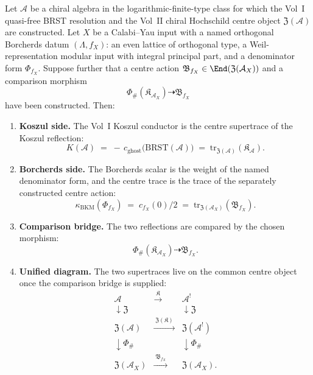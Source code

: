\begin{theorem}
\label{thm:phi-universal-trace}
Let $\mathcal A$ be a chiral algebra in the logarithmic-finite-type
class for which the Vol~I quasi-free BRST resolution and the Vol~II
chiral Hochschild centre object \(\mathfrak Z(\mathcal A)\) are
constructed.  Let \(X\) be a Calabi--Yau input with a named orthogonal
Borcherds datum \((\Lambda,f_X)\): an even lattice of orthogonal type,
a Weil-representation modular input with integral principal part, and a
denominator form \(\Phi_{f_X}\).  Suppose further that a centre action
\(\mathfrak B_{f_X}\in\End(\mathfrak Z(\mathcal A_X))\) and a comparison
morphism
\[
 \Phi_\#(\mathfrak K_{\mathcal A_X})\dashrightarrow \mathfrak B_{f_X}
\]
have been constructed.  Then:
\begin{enumerate}[label=\textup{(\roman*)}]
 \item \textbf{Koszul side.} The Vol~I Koszul conductor is the centre
 supertrace of the Koszul reflection:
 \[
 K(\mathcal{A}) \;=\; -\,c_{\mathrm{ghost}}\bigl(\mathrm{BRST}(\mathcal{A})\bigr)
 \;=\; \mathrm{tr}_{\mathfrak{Z}(\mathcal{A})}(\mathfrak{K}_{\mathcal{A}}).
 \]
 \item \textbf{Borcherds side.} The Borcherds scalar is the weight of
 the named denominator form, and the centre trace is the trace of the
 separately constructed centre action:
 \[
 \kappa_{\mathrm{BKM}}(\Phi_{f_X})
 \;=\; c_{f_X}(0)/2
 \;=\; \mathrm{tr}_{\mathfrak{Z}(\mathcal{A}_X)}(\mathfrak{B}_{f_X}).
 \]
 \item \textbf{Comparison bridge.} The two reflections are compared by
 the chosen morphism:
 \[
 \Phi_\#(\mathfrak K_{\mathcal A_X})\dashrightarrow\mathfrak B_{f_X}.
 \]
 \item \textbf{Unified diagram.} The two supertraces live on the common
 centre object once the comparison bridge is supplied:
 \[
 \begin{array}{ccc}
 \mathcal{A} & \xrightarrow{\;\mathfrak{K}\;} & \mathcal{A}^! \\
 \downarrow\mathfrak{Z} & & \downarrow\mathfrak{Z} \\
 \mathfrak{Z}(\mathcal{A}) & \xrightarrow{\;\mathfrak{Z}(\mathfrak{K})\;} & \mathfrak{Z}(\mathcal{A}^!) \\
 \downarrow\Phi_\# & & \downarrow\Phi_\# \\
 \mathfrak{Z}(\mathcal A_X) & \xrightarrow{\;\mathfrak B_{f_X}\;} &
 \mathfrak{Z}(\mathcal A_X).
 \end{array}
 \]
\end{enumerate}
\end{theorem}


